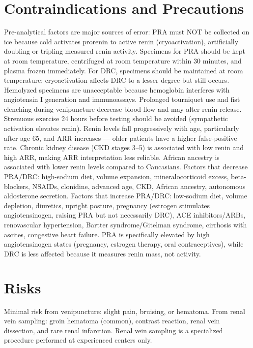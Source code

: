 \section*{Contraindications and Precautions}
Pre-analytical factors are major sources of error: PRA must NOT be collected on ice because cold activates prorenin to active renin (cryoactivation), artificially doubling or tripling measured renin activity. Specimens for PRA should be kept at room temperature, centrifuged at room temperature within 30 minutes, and plasma frozen immediately. For DRC, specimens should be maintained at room temperature; cryoactivation affects DRC to a lesser degree but still occurs. Hemolyzed specimens are unacceptable because hemoglobin interferes with angiotensin I generation and immunoassays. Prolonged tourniquet use and fist clenching during venipuncture decrease blood flow and may alter renin release. Strenuous exercise 24 hours before testing should be avoided (sympathetic activation elevates renin). Renin levels fall progressively with age, particularly after age 65, and ARR increases --- older patients have a higher false-positive rate. Chronic kidney disease (CKD stages 3--5) is associated with low renin and high ARR, making ARR interpretation less reliable. African ancestry is associated with lower renin levels compared to Caucasians. Factors that decrease PRA/DRC: high-sodium diet, volume expansion, mineralocorticoid excess, beta-blockers, NSAIDs, clonidine, advanced age, CKD, African ancestry, autonomous aldosterone secretion. Factors that increase PRA/DRC: low-sodium diet, volume depletion, diuretics, upright posture, pregnancy (estrogen stimulates angiotensinogen, raising PRA but not necessarily DRC), ACE inhibitors/ARBs, renovascular hypertension, Bartter syndrome/Gitelman syndrome, cirrhosis with ascites, congestive heart failure. PRA is specifically elevated by high angiotensinogen states (pregnancy, estrogen therapy, oral contraceptives), while DRC is less affected because it measures renin mass, not activity.

\section*{Risks}
Minimal risk from venipuncture: slight pain, bruising, or hematoma. From renal vein sampling: groin hematoma (common), contrast reaction, renal vein dissection, and rare renal infarction. Renal vein sampling is a specialized procedure performed at experienced centers only.


